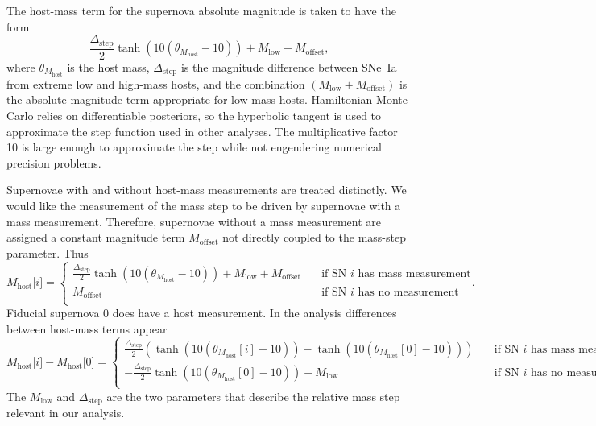 \documentclass{aastex61}   	%
\begin{document}
The host-mass term for the supernova absolute magnitude is taken to have the form
\begin{equation}
\frac{\Delta_{\mathrm{step}}}{2} \tanh{\left(10(\theta_{M_{\text{host}}}-10)\right)} + M_{\mathrm{low}} + M_{\mathrm{offset}},
\end{equation}
where $\theta_{M_{\text{host}}}$ is the host mass,  $\Delta_{\mathrm{step}}$  is the magnitude difference
between SNe~Ia from extreme low and  high-mass hosts, and the combination $(M_{\mathrm{low}}+M_{\mathrm{offset}})$ is the  
absolute magnitude term appropriate for low-mass hosts.  Hamiltonian
Monte Carlo relies on differentiable posteriors, so the hyperbolic tangent is used to approximate the step function used in other analyses.
The multiplicative factor 10 is large enough to approximate the step while not engendering numerical precision problems.

Supernovae with and without host-mass measurements are treated distinctly.  We would like the measurement
of the mass step to be driven by supernovae with a mass measurement.  Therefore, supernovae
without a mass measurement are assigned a constant magnitude term $M_{\mathrm{offset}}$
not directly coupled to the mass-step parameter.  Thus
\begin{equation}
M_{\mathrm{host}}\mathrm[i]=\begin{cases}
\frac{\Delta_{\mathrm{step}}}{2}
\tanh{\left(10(\theta_{M_{\text{host}}}-10)\right)+ M_{\mathrm{low}} + M_{\mathrm{offset}}}& \quad \text{if SN }i\text{ has mass measurement} \\
M_{\mathrm{offset}} & \quad \text{if SN }i\text{ has no measurement}  \\
\end{cases}.
\end{equation}
Fiducial supernova 0 does have a host measurement.
In the analysis differences between host-mass terms appear
\begin{equation}
M_{\mathrm{host}}\mathrm[i] -M_{\mathrm{host}}\mathrm[0]  = 
\begin{cases}
\frac{\Delta_{\mathrm{step}}}{2} \left(
\tanh{\left(10(\theta_{M_{\text{host}}}[i]-10)\right)} - \tanh{\left(10(\theta_{M_{\text{host}}}[0]-10)\right)} \right)
& \quad \text{if SN }i\text{ has mass measurement} \\
-\frac{\Delta_{\mathrm{step}}}{2}  \tanh{\left(10(\theta_{M_{\text{host}}}[0]-10)\right)} - M_{\mathrm{low}}
 & \quad \text{if SN }i\text{ has no measurement}  \\
\end{cases}.
\end{equation}
The $M_{\mathrm{low}}$ and $\Delta_{\mathrm{step}}$ are the two parameters that describe the relative mass step
relevant in our analysis.
\end{document}
